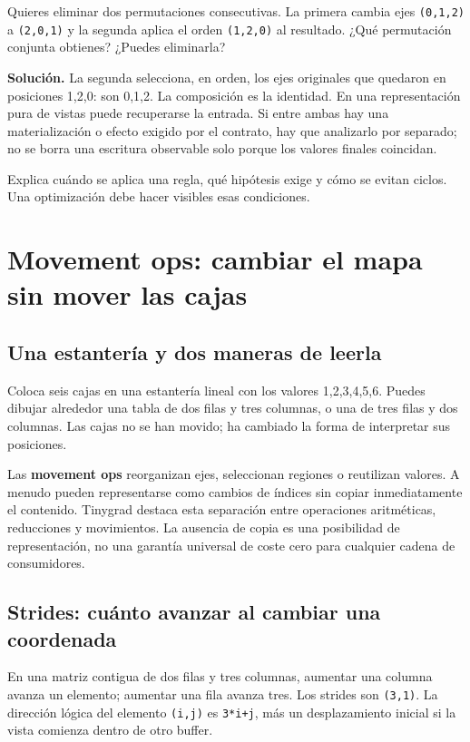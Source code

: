 \documentclass[12pt,a4paper,oneside]{report}
\begin{document}
\begin{practica}
Quieres eliminar dos permutaciones consecutivas. La primera cambia ejes \texttt{(0,1,2)} a \texttt{(2,0,1)} y la segunda aplica el orden \texttt{(1,2,0)} al resultado. ¿Qué permutación conjunta obtienes? ¿Puedes eliminarla?

\end{practica}
\textbf{Solución.} La segunda selecciona, en orden, los ejes originales que quedaron en posiciones 1,2,0: son 0,1,2. La composición es la identidad. En una representación pura de vistas puede recuperarse la entrada. Si entre ambas hay una materialización o efecto exigido por el contrato, hay que analizarlo por separado; no se borra una escritura observable solo porque los valores finales coincidan.

\begin{comprueba}
Explica cuándo se aplica una regla, qué hipótesis exige y cómo se evitan ciclos. Una optimización debe hacer visibles esas condiciones.

\end{comprueba}

\chapter{Movement ops: cambiar el mapa sin mover las cajas}
\label{ch:movement}
\section{Una estantería y dos maneras de leerla}
Coloca seis cajas en una estantería lineal con los valores 1,2,3,4,5,6. Puedes dibujar alrededor una tabla de dos filas y tres columnas, o una de tres filas y dos columnas. Las cajas no se han movido; ha cambiado la forma de interpretar sus posiciones.

Las \textbf{movement ops} reorganizan ejes, seleccionan regiones o reutilizan valores. A menudo pueden representarse como cambios de índices sin copiar inmediatamente el contenido. Tinygrad destaca esta separación entre operaciones aritméticas, reducciones y movimientos. La ausencia de copia es una posibilidad de representación, no una garantía universal de coste cero para cualquier cadena de consumidores. \cite{tinygrad-site}

\section{Strides: cuánto avanzar al cambiar una coordenada}
En una matriz contigua de dos filas y tres columnas, aumentar una columna avanza un elemento; aumentar una fila avanza tres. Los strides son \texttt{(3,1)}. La dirección lógica del elemento \texttt{(i,j)} es \texttt{3*i+j}, más un desplazamiento inicial si la vista comienza dentro de otro buffer.
\end{document}
